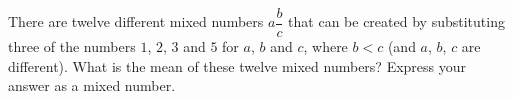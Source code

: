 There are twelve different mixed numbers $a\dfrac {b}{c}$ that can be created by substituting three of the numbers $1$, $2$, $3$ and $5$ for $a$, $b$ and $c$, where $b<c$ (and $a$, $b$, $c$ are different). What is the mean of these twelve mixed numbers? Express your answer as a mixed number.
